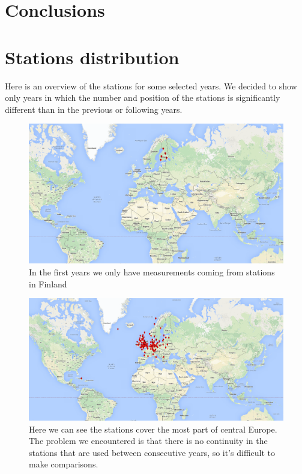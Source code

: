\documentclass{vldb}
\begin{document}
\section{Conclusions}
\label{sec:con}

\newpage
\appendix
\section{Stations distribution} \label{App:AppendixA}
Here is an overview of the stations for some selected years. We decided to show only years in which the number and position of the stations is significantly different than in the previous or following years.

\begin{figure}[tbh]
\includegraphics[width=1\linewidth]{stations1907}
\caption{In the first years we only have measurements coming from stations in Finland}
\label{fig:stations1907}
\end{figure}

\begin{figure}[tbh]
\includegraphics[width=1\linewidth]{stations1930}
\caption{Here we can see the stations cover the most part of central Europe. The problem we encountered is that there is no continuity in the stations that are used between consecutive years, so it's difficult to make comparisons.}
\label{fig:stations1930}
\end{figure}
\end{document}

